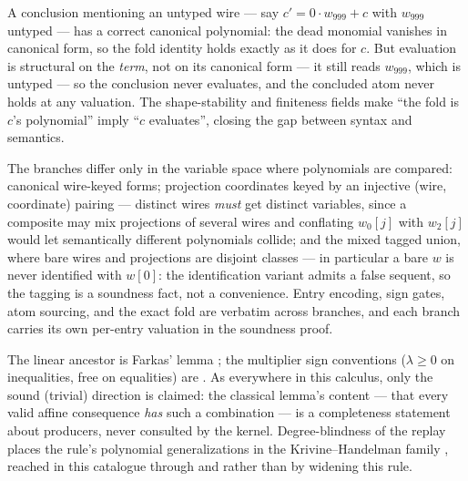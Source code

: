 \begin{bremark}
\label{rem:fk-b13}
A conclusion mentioning an untyped wire --- say
$c' = 0 \cdot w_{999} + c$ with $w_{999}$ untyped --- has a correct
canonical polynomial: the dead monomial vanishes in canonical form, so
the fold identity holds exactly as it does for $c$. But evaluation is
structural on the \emph{term}, not on its canonical form --- it still
reads $w_{999}$, which is untyped --- so the conclusion never
evaluates, and the concluded atom never holds at any valuation. The shape-stability and finiteness
fields make ``the fold is $c$'s polynomial'' imply ``$c$
evaluates'', closing the gap between syntax and semantics.
\end{bremark}

\begin{bremark}
\label{rem:fk-branches}
The branches differ only in the variable space where polynomials are
compared: canonical wire-keyed forms; projection coordinates keyed by
an injective (wire, coordinate) pairing --- distinct wires \emph{must}
get distinct variables, since a composite may mix projections of
several wires and conflating $w_0[j]$ with $w_2[j]$ would let
semantically different polynomials collide; and the mixed tagged union,
where bare wires and projections are disjoint classes --- in
particular a bare $w$ is never identified with $w[0]$: the
identification variant admits a false sequent, so the tagging is a
soundness fact, not a convenience. Entry encoding, sign gates, atom
sourcing, and the exact fold are verbatim across branches, and each
branch carries its own per-entry valuation in the soundness proof.
\end{bremark}

\begin{bremark}
The linear ancestor is Farkas' lemma \cite{farkas1902}; the multiplier
sign conventions ($\lambda \geq 0$ on inequalities, free on equalities)
are \cite[\S7]{schrijver1986}. As everywhere in this calculus, only
the sound (trivial) direction is claimed: the classical lemma's
content --- that every valid affine consequence \emph{has} such a
combination --- is a completeness statement about producers, never
consulted by the kernel. Degree-blindness of the replay places the
rule's polynomial generalizations in the Krivine--Handelman family
\cite{krivine1964,handelman1988}, reached in this catalogue through
 and  rather than by widening this
rule.
\end{bremark}

